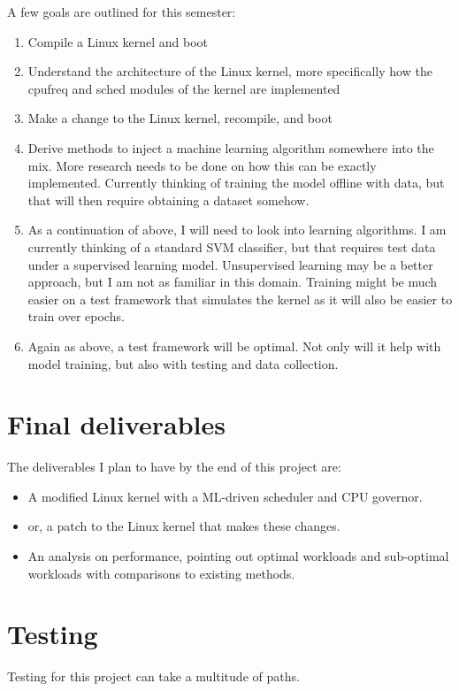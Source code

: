 \documentclass[12pt]{article}
\def\ind{\hspace*{0.3in}}
\begin{document}
A few goals are outlined for this semester:
\begin{enumerate}
    \item Compile a Linux kernel and boot
    \item Understand the architecture of the Linux kernel, more specifically how the cpufreq and sched modules of the kernel are implemented
    \item Make a change to the Linux kernel, recompile, and boot
    \item Derive methods to inject a machine learning algorithm somewhere into the mix. More research needs to be done on how this can be exactly implemented. Currently thinking of training the model offline with data, but that will then require obtaining a dataset somehow.
    \item As a continuation of above, I will need to look into learning algorithms. I am currently thinking of a standard SVM classifier, but that requires test data under a supervised learning model. Unsupervised learning may be a better approach, but I am not as familiar in this domain. Training might be much easier on a test framework that simulates the kernel as it will also be easier to train over epochs.
    \item Again as above, a test framework will be optimal. Not only will it help with model training, but also with testing and data collection.
\end{enumerate}
\section*{Final deliverables}
The deliverables I plan to have by the end of this project are:

\begin{itemize}
    \item A modified Linux kernel with a ML-driven scheduler and CPU governor.
    \item or, a patch to the Linux kernel that makes these changes.
    \item An analysis on performance, pointing out optimal workloads and sub-optimal workloads with comparisons to existing methods.
\end{itemize}

\section*{Testing}

\ind Testing for this project can take a multitude of paths. 
\end{document}
